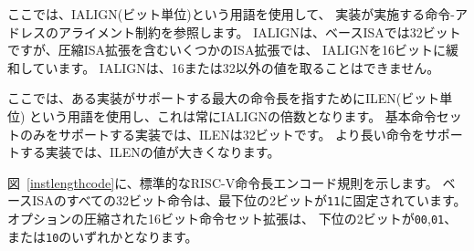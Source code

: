 ここでは、IALIGN(ビット単位)という用語を使用して、
実装が実施する命令-アドレスのアライメント制約を参照します。
IALIGNは、ベースISAでは32ビットですが、圧縮ISA拡張を含むいくつかのISA拡張では、
IALIGNを16ビットに緩和しています。
IALIGNは、16または32以外の値を取ることはできません。

ここでは、ある実装がサポートする最大の命令長を指すためにILEN(ビット単位)
という用語を使用し、これは常にIALIGNの倍数となります。
基本命令セットのみをサポートする実装では、ILENは32ビットです。
より長い命令をサポートする実装では、ILENの値が大きくなります。

図~\ref{instlengthcode}に、標準的なRISC-V命令長エンコード規則を示します。
ベースISAのすべての32ビット命令は、最下位の2ビットが{\tt 11}に固定されています。
オプションの圧縮された16ビット命令セット拡張は、
下位の2ビットが{\tt 00},{\tt 01}、または{\tt 10}のいずれかとなります。

